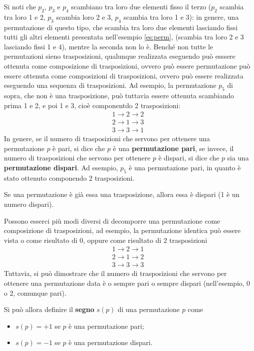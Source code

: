 Si noti che $p_2$, $p_3$ e $p_4$ scambiano tra loro due elementi fisso il terzo
($p_2$ scambia tra loro 1 e 2, $p_3$ scambia loro 2 e 3, $p_4$ scambia tra loro 1 e
3): in genere, una permutazione di questo tipo, che scambia tra loro due elementi
lasciando fissi tutti gli altri elementi presentata nell'esempio \ref{es:perm},
(scambia tra loro 2 e 3 lasciando fissi 1 e 4), mentre la seconda non lo è. Benché
non tutte le permutazioni sieno trasposizioni, qualunque realizzata eseguendo può
esssere ottenuta come composizione di trasposizioni, ovvero può essere permutazione
può essere ottenuta come composizioni di trasposizioni, ovvero può essere realizzata
eseguendo una sequenza di trasposizioni. Ad esempio, la permutazione $p_5$ di sopra,
che non è una trasposizione, può tuttavia essere ottenuta scambiando prima 1 e 2, e
poi 1 e 3, cioè componentdo 2 trasposizioni:
\begin{equation*}
  \begin{matrix}
    1 \to 2 \to 2\\
    2 \to 1 \to 3\\
    3 \to 3 \to 1
  \end{matrix}
\end{equation*}
In genere, se il numero di trasposizioni che servono per ottenere una permutazione
$p$ è pari, si dice che $p$ è una \textbf{permutazione pari}, se invece, il numero
di trasposizioni che servono per ottenere $p$ è dispari, si dice che $p$ sia una
\textbf{permutazione dispari}. Ad esempio, $p_5$ è una permutazione pari, in quanto
è stato ottenuto componendo 2 trasposizioni.
\begin{oss}
  \label{oss:perm1}
  Se una permutazione è già essa una trasposizione, allora essa è dispari (1 è un
  numero dispari).
\end{oss}
\begin{oss}
  \label{oss:perm2}
  Possono esserci più modi diversi di decomporre una permutazione come composizione
  di trasposizioni, ad esempio, la permutazione identica può essere vista o come
  risultato di $0$, oppure come risultato di 2 trasposizioni
  \begin{equation*}
    \begin{matrix}
      1 \to 2 \to 1\\
      2 \to 1 \to 2\\
      3 \to 3 \to 3
    \end{matrix}
  \end{equation*}
  Tuttavia, si può dimostrare che il numero di trasposizioni che servono per
  ottenere una permutazione data è o sempre pari o sempre dispari (nell'esempio, 0
  o 2, comunque pari).
\end{oss}
Si può allora definire il \textbf{segno} $s(p)$ di una permutazione $p$ come
\begin{itemize}
\item $s(p)=+1$ se $p$ è una permutazione pari;
\item $s(p)=-1$ se $p$ è una permutazione dispari.
\end{itemize}

